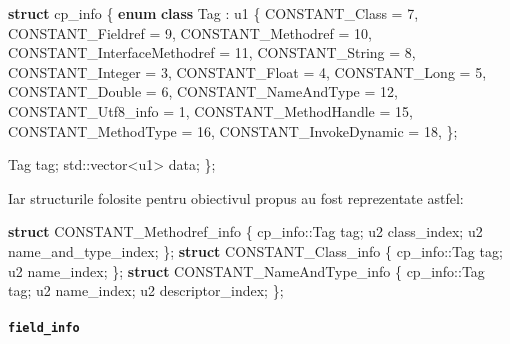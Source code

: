 \documentclass[]{article}
\newenvironment{Shaded}{}{}
\newcommand{\KeywordTok}[1]{\textcolor[rgb]{0.00,0.44,0.13}{\textbf{#1}}}
\newcommand{\DecValTok}[1]{\textcolor[rgb]{0.25,0.63,0.44}{#1}}
\newcommand{\BuiltInTok}[1]{#1}
\newcommand{\NormalTok}[1]{#1}
\let\oldparagraph\paragraph
\renewcommand{\paragraph}[1]{\oldparagraph{#1}\mbox{}}
\begin{document}
\begin{Shaded}
	\begin{Highlighting}[]
		\KeywordTok{struct}\NormalTok{ cp_info \{}
		\KeywordTok{enum} \KeywordTok{class}\NormalTok{ Tag : u1 \{}
		\NormalTok{        CONSTANT_Class = }\DecValTok{7}\NormalTok{,}
		\NormalTok{        CONSTANT_Fieldref = }\DecValTok{9}\NormalTok{,}
		\NormalTok{        CONSTANT_Methodref = }\DecValTok{10}\NormalTok{,}
		\NormalTok{        CONSTANT_InterfaceMethodref = }\DecValTok{11}\NormalTok{,}
		\NormalTok{        CONSTANT_String = }\DecValTok{8}\NormalTok{,}
		\NormalTok{        CONSTANT_Integer = }\DecValTok{3}\NormalTok{,}
		\NormalTok{        CONSTANT_Float = }\DecValTok{4}\NormalTok{,}
		\NormalTok{        CONSTANT_Long = }\DecValTok{5}\NormalTok{,}
		\NormalTok{        CONSTANT_Double = }\DecValTok{6}\NormalTok{,}
		\NormalTok{        CONSTANT_NameAndType = }\DecValTok{12}\NormalTok{,}
		\NormalTok{        CONSTANT_Utf8_info = }\DecValTok{1}\NormalTok{,}
		\NormalTok{        CONSTANT_MethodHandle = }\DecValTok{15}\NormalTok{,}
		\NormalTok{        CONSTANT_MethodType = }\DecValTok{16}\NormalTok{,}
		\NormalTok{        CONSTANT_InvokeDynamic = }\DecValTok{18}\NormalTok{,}
		\NormalTok{    \};}

		\NormalTok{    Tag tag;}
		\BuiltInTok{std::}\NormalTok{vector<u1> data;}
		\NormalTok{\};}
	\end{Highlighting}
\end{Shaded}

Iar structurile folosite pentru obiectivul propus au fost reprezentate
astfel:

\begin{Shaded}
	\begin{Highlighting}[]
		\KeywordTok{struct}\NormalTok{ CONSTANT_Methodref_info \{}
		\NormalTok{    cp_info::Tag tag;}
		\NormalTok{    u2 class_index;}
		\NormalTok{    u2 name_and_type_index;}
		\NormalTok{\};}
		\KeywordTok{struct}\NormalTok{ CONSTANT_Class_info \{}
		\NormalTok{    cp_info::Tag tag;}
		\NormalTok{    u2 name_index;}
		\NormalTok{\};}
		\KeywordTok{struct}\NormalTok{ CONSTANT_NameAndType_info \{}
		\NormalTok{    cp_info::Tag tag;}
		\NormalTok{    u2 name_index;}
		\NormalTok{    u2 descriptor_index;}
		\NormalTok{\};}
	\end{Highlighting}
\end{Shaded}

\paragraph{\texorpdfstring{\texttt{field\_info}}{field\_info}}\label{field_info}
\end{document}
